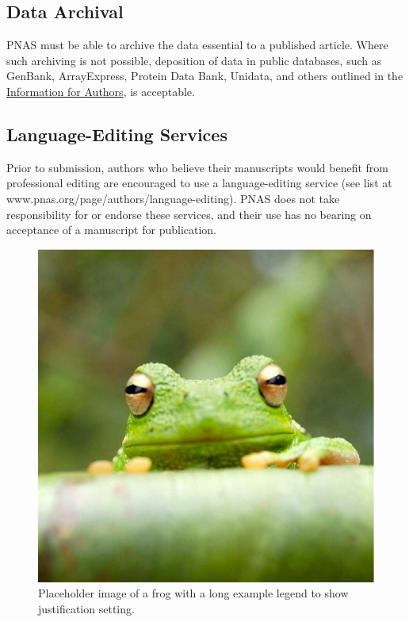 \documentclass[9pt,twocolumn,twoside,lineno]{pnas-new}
\begin{document}
\subsection*{Data Archival}

PNAS must be able to archive the data essential to a published article. Where such archiving is not possible, deposition of data in public databases, such as GenBank, ArrayExpress, Protein Data Bank, Unidata, and others outlined in the \href{https://www.pnas.org/page/authors/journal-policies#xi}{Information for Authors}, is acceptable.

\subsection*{Language-Editing Services}
Prior to submission, authors who believe their manuscripts would benefit from professional editing are encouraged to use a language-editing service (see list at www.pnas.org/page/authors/language-editing). PNAS does not take responsibility for or endorse these services, and their use has no bearing on acceptance of a manuscript for publication. 

\begin{figure}%
\centering
\includegraphics[width=.8\linewidth]{frog}
\caption{Placeholder image of a frog with a long example legend to show justification setting.}
\label{fig:frog}
\end{figure}
\end{document}
